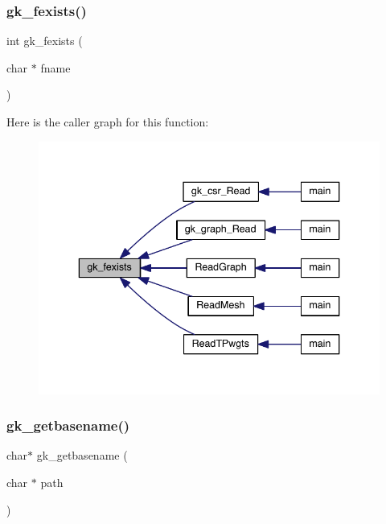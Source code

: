 \mbox{\label{a00035_a627221a374552b5b6659d855b7446187}} 
\subsubsection{\texorpdfstring{gk\+\_\+fexists()}{gk\_fexists()}}
{\footnotesize\ttfamily int gk\+\_\+fexists (\begin{DoxyParamCaption}\item[{char $\ast$}]{fname }\end{DoxyParamCaption})}

Here is the caller graph for this function\+:\nopagebreak
\begin{figure}[H]
\begin{center}
\leavevmode
\includegraphics[width=340pt]{a00035_a627221a374552b5b6659d855b7446187_icgraph}
\end{center}
\end{figure}
\mbox{\label{a00035_ad732cbb6372e1eb9b396792f700091a5}} 
\subsubsection{\texorpdfstring{gk\+\_\+getbasename()}{gk\_getbasename()}}
{\footnotesize\ttfamily char$\ast$ gk\+\_\+getbasename (\begin{DoxyParamCaption}\item[{char $\ast$}]{path }\end{DoxyParamCaption})}

